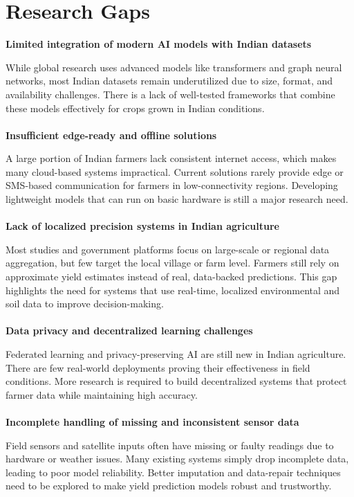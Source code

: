 \section{Research Gaps}
\textbf{Limited integration of modern AI models with Indian datasets}  

While global research uses advanced models like transformers and graph neural networks, most Indian datasets remain underutilized due to size, format, and availability challenges. There is a lack of well-tested frameworks that combine these models effectively for crops grown in Indian conditions.
\\\\
\textbf{Insufficient edge-ready and offline solutions}  

A large portion of Indian farmers lack consistent internet access, which makes many cloud-based systems impractical. Current solutions rarely provide edge or SMS-based communication for farmers in low-connectivity regions. Developing lightweight models that can run on basic hardware is still a major research need.
\\\\
\textbf{Lack of localized precision systems in Indian agriculture}  

Most studies and government platforms focus on large-scale or regional data aggregation, but few target the local village or farm level. Farmers still rely on approximate yield estimates instead of real, data-backed predictions. This gap highlights the need for systems that use real-time, localized environmental and soil data to improve decision-making.
\\\\
\textbf{Data privacy and decentralized learning challenges}  

Federated learning and privacy-preserving AI are still new in Indian agriculture. There are few real-world deployments proving their effectiveness in field conditions. More research is required to build decentralized systems that protect farmer data while maintaining high accuracy.
\\\\
\textbf{Incomplete handling of missing and inconsistent sensor data}  

Field sensors and satellite inputs often have missing or faulty readings due to hardware or weather issues. Many existing systems simply drop incomplete data, leading to poor model reliability. Better imputation and data-repair techniques need to be explored to make yield prediction models robust and trustworthy.
